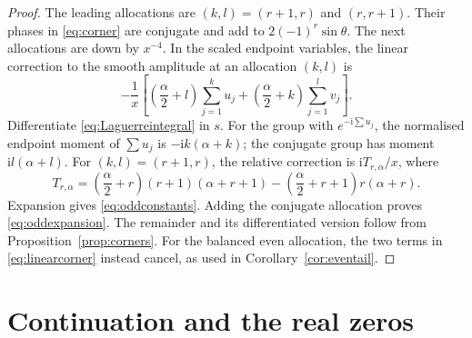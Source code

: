 \documentclass[11pt]{article}
\numberwithin{equation}{section}
\theoremstyle{remark}
\newcommand{\ii}{\mathrm{i}}
\begin{document}
\begin{proof}
The leading allocations are $(k,l)=(r+1,r)$ and $(r,r+1)$.
Their phases in \eqref{eq:corner} are conjugate and add to
$2(-1)^r\sin\theta$. The next allocations are down by $x^{-4}$.
In the scaled endpoint variables, the linear correction to the smooth
amplitude at an allocation $(k,l)$ is
\begin{equation}\label{eq:linearcorner}
 -\frac1x\left[
    \left(\frac\alpha2+l\right)\sum_{j=1}^k u_j
   +\left(\frac\alpha2+k\right)\sum_{j=1}^l v_j\right].
\end{equation}
Differentiate \eqref{eq:Laguerreintegral} in $s$. For the group with
$e^{-\ii\sum u_j}$, the normalised endpoint moment of $\sum u_j$ is
$-\ii k(\alpha+k)$; the conjugate group has moment
$\ii l(\alpha+l)$. For $(k,l)=(r+1,r)$, the relative correction
is $\ii T_{r,\alpha}/x$, where
\[
 T_{r,\alpha}=
 \left(\frac\alpha2+r\right)(r+1)(\alpha+r+1)
 -\left(\frac\alpha2+r+1\right)r(\alpha+r).
\]
Expansion gives \eqref{eq:oddconstants}. Adding the conjugate allocation
proves \eqref{eq:oddexpansion}. The remainder and its differentiated
version follow from Proposition~\ref{prop:corners}. For the balanced
even allocation, the two terms in \eqref{eq:linearcorner} instead
cancel, as used in Corollary~\ref{cor:eventail}.
\end{proof}

\section{Continuation and the real zeros}\label{sec:continuation}
\end{document}
